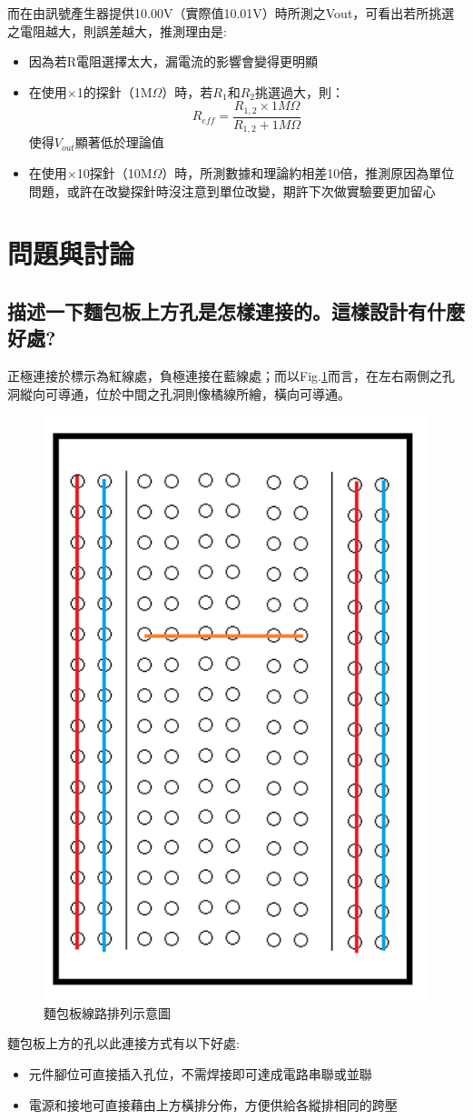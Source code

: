 \documentclass[12pt,a4paper]{article}
\begin{document}
\begin{CJK}{UTF8}{bkai}
而在由訊號產生器提供10.00V（實際值10.01V）時所測之Vout，可看出若所挑選之電阻越大，則誤差越大，推測理由是:
\begin{itemize}
    \item 因為若R電阻選擇太大，漏電流的影響會變得更明顯
    \item 在使用$\times$1的探針（1M$\Omega$）時，若$R_{1}$和$R_{2}$挑選過大，則：
    \begin{equation}
        R_{eff} = \frac{R_{1,2}\times1M\Omega}{R_{1,2}+1M\Omega}
    \end{equation}
    使得$V_{out}$顯著低於理論值
    \item 在使用$\times$10探針（10M$\Omega$）時，所測數據和理論約相差10倍，推測原因為單位問題，或許在改變探針時沒注意到單位改變，期許下次做實驗要更加留心
\end{itemize}



\clearpage

\section{問題與討論}

\subsection{描述一下麵包板上方孔是怎樣連接的。這樣設計有什麼好處?}\label{subsec:1}
\hfill

正極連接於標示為紅線處，負極連接在藍線處；而以Fig.\ref{fig:bread}而言，在左右兩側之孔洞縱向可導通，位於中間之孔洞則像橘線所繪，橫向可導通。
\begin{figure}[h]
    \centering
    \includegraphics[width=0.4\linewidth]{figures/bread.png}
    \caption{麵包板線路排列示意圖}
    \label{fig:bread}
\end{figure}
\newline
    麵包板上方的孔以此連接方式有以下好處:
    \begin{itemize}
        \item 元件腳位可直接插入孔位，不需焊接即可達成電路串聯或並聯
        \item 電源和接地可直接藉由上方橫排分佈，方便供給各縱排相同的跨壓
    \end{itemize}


\end{CJK}
\end{document}
